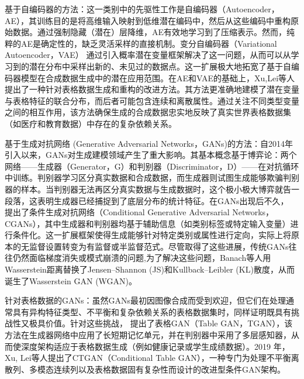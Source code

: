 基于自编码器的方法：这一类别中的先驱性工作是自编码器（Autoencoder，AE）\citep{hinton2006reducing}，其训练目的是将高维输入映射到低维潜在编码中，然后从这些编码中重构原始数据。通过强制隐藏（潜在）层降维，AE有效地学习到了压缩表示。然而，纯粹的AE是确定性的，缺乏灵活采样的直接机制。变分自编码器（Variational Autoencoder，VAE）\citep{kingma2013auto} 通过引入概率潜在变量框架解决了这一问题，从而可以从学习到的潜在分布中采样出新的、未见过的数据点。这一扩展极大地拓宽了基于自编码器模型在合成数据生成中的潜在应用范围。在AE和VAE的基础上，Xu,Lei等人\citep{xu2019modeling} 提出了一种针对表格数据生成和重构的改进方法。其方法更准确地建模了潜在变量与表格特征的联合分布，而后者可能包含连续和离散属性。通过关注不同类型变量之间的相互作用，该方法确保生成的合成数据忠实地反映了真实世界表格数据集（如医疗和教育数据）中存在的复杂依赖关系。

基于生成对抗网络 (Generative Adversarial Networks，GANs)\citep{goodfellow2014generative}的方法：自2014年引入以来，GANs对生成建模领域产生了重大影响。其基本概念基于博弈论：两个网络——生成器（Generator，G）和判别器（Discriminator，D）——在对抗循环中训练。判别器学习区分真实数据和合成数据，而生成器则试图生成能够欺骗判别器的样本。当判别器无法再区分真实数据与生成数据时，这个极小极大博弈就告一段落，这表明生成器已经捕捉到了底层分布的统计特征。在GANs出现后不久，\citep{mirza2014conditional} 提出了条件生成对抗网络（Conditional Generative Adversarial Networks，CGANs），其中生成器和判别器均基于辅助信息（如类别标签或特定输入变量）进行条件化。这一扩展框架使得生成能够针对特定类别或属性进行定向，实际上将原本的无监督设置转变为有监督或半监督范式。尽管取得了这些进展，传统GANs往往仍然面临梯度消失或模式崩溃的问题,为了解决这些问题，Banach等人用Wasserstein距离替换了Jensen–Shannon (JS)和Kullback–Leibler (KL)散度，从而诞生了Wasserstein GAN (WGAN)\citep{adler2018banach,arjovsky2017towards}。

针对表格数据的GANs：虽然GANs最初因图像合成而受到欢迎，但它们在处理通常具有异构特征类型、不平衡和复杂依赖关系的表格数据集时，同样证明既具有挑战性又极具价值。针对这些挑战，\citep{xu2018synthesizing} 提出了表格GAN（Table GAN，TGAN），该方法在生成器网络中应用了长短期记忆单元，并在判别器中采用了多层感知器，从而使深度架构适应于表格数据生成（例如健康记录或学生成绩数据）。2019 年，Xu, Lei等人\citep{xu2019modeling}提出了CTGAN（Conditional Table GAN），一种专门为处理不平衡离散列、多模态连续列以及表格数据固有复杂性而设计的改进型条件GAN架构。

